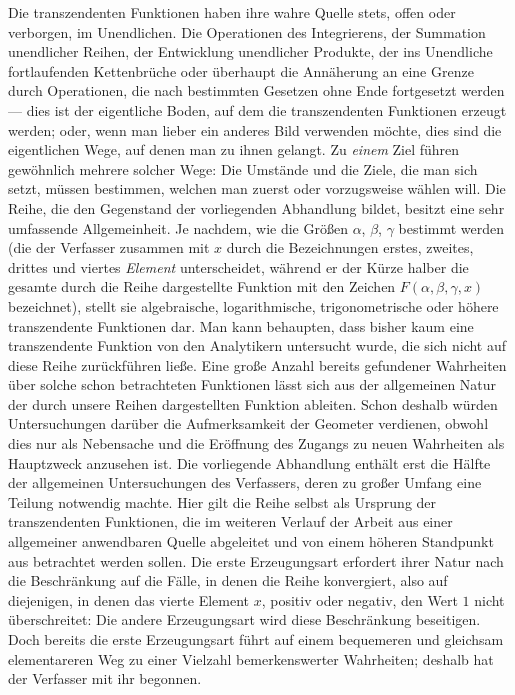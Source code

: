 Die transzendenten Funktionen haben ihre wahre Quelle stets, offen oder verborgen, im Unendlichen. Die Operationen des Integrierens, der Summation unendlicher Reihen, der Entwicklung unendlicher Produkte, der ins Unendliche fortlaufenden Kettenbrüche oder überhaupt die Annäherung an eine Grenze durch Operationen, die nach bestimmten Gesetzen ohne Ende fortgesetzt werden --- dies ist der eigentliche Boden, auf dem die transzendenten Funktionen erzeugt werden; oder, wenn man lieber ein anderes Bild verwenden möchte, dies sind die eigentlichen Wege, auf denen man zu ihnen gelangt. Zu \emph{einem} Ziel führen gewöhnlich mehrere solcher Wege: Die Umstände und die Ziele, die man sich setzt, müssen bestimmen, welchen man zuerst oder vorzugsweise wählen will. Die Reihe, die den Gegenstand der vorliegenden Abhandlung bildet, besitzt eine sehr umfassende Allgemeinheit. Je nachdem, wie die Größen $\alpha$, $\beta$, $\gamma$ bestimmt werden (die der Verfasser zusammen mit $x$ durch die Bezeichnungen erstes, zweites, drittes und viertes \emph{Element} unterscheidet, während er der Kürze halber die gesamte durch die Reihe dargestellte Funktion mit den Zeichen $F(\alpha,\beta,\gamma,x)$ bezeichnet), stellt sie algebraische, logarithmische, trigonometrische oder höhere transzendente Funktionen dar. Man kann behaupten, dass bisher kaum eine transzendente Funktion von den Analytikern untersucht wurde, die sich nicht auf diese Reihe zurückführen ließe. Eine große Anzahl bereits gefundener Wahrheiten über solche schon betrachteten Funktionen lässt sich aus der allgemeinen Natur der durch unsere Reihen dargestellten Funktion ableiten. Schon deshalb würden Untersuchungen darüber die Aufmerksamkeit der Geometer verdienen, obwohl dies nur als Nebensache und die Eröffnung des Zugangs zu neuen Wahrheiten als Hauptzweck anzusehen ist. Die vorliegende Abhandlung enthält erst die Hälfte der allgemeinen Untersuchungen des Verfassers, deren zu großer Umfang eine Teilung notwendig machte. Hier gilt die Reihe selbst als Ursprung der transzendenten Funktionen, die im weiteren Verlauf der Arbeit aus einer allgemeiner anwendbaren Quelle abgeleitet und von einem höheren Standpunkt aus betrachtet werden sollen. Die erste Erzeugungsart erfordert ihrer Natur nach die Beschränkung auf die Fälle, in denen die Reihe konvergiert, also auf diejenigen, in denen das vierte Element $x$, positiv oder negativ,
den Wert $1$ nicht überschreitet: Die andere Erzeugungsart wird diese Beschränkung beseitigen. Doch bereits die erste Erzeugungsart führt auf einem bequemeren und gleichsam elementareren Weg zu einer Vielzahl bemerkenswerter Wahrheiten; deshalb hat der Verfasser mit ihr begonnen.

